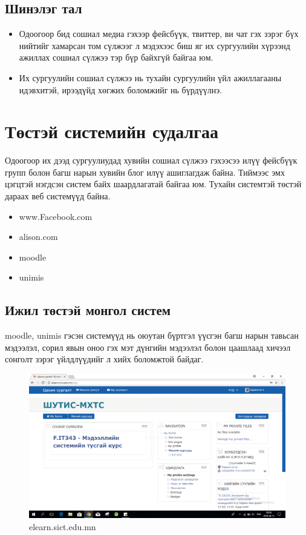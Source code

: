 \subsection{Шинэлэг тал}
\begin{itemize}
	\item Одоогоор бид сошиал медиа гэхээр фейсбүүк, твиттер, ви чат гэх зэрэг бүх нийтийг хамарсан том сүлжээг л мэдэхээс биш яг их сургуулийн хүрээнд ажиллах сошиал сүлжээ тэр бүр байхгүй байгаа юм.
	\item Их сургуулийн сошиал сүлжээ нь тухайн сургуулийн үйл ажиллагааны идэвхитэй, ирээдүйд хөгжих боломжийг нь бүрдүүлнэ.
\end{itemize}

\newpage
\section{Төстэй системийн судалгаа}
\hspace{1cm}Одоогоор их дээд сургуулиудад хувийн сошиал сүлжээ гэхээсээ илүү фейсбүүк групп болон багш нарын хувийн блог илүү ашиглагдаж байна. Тиймээс эмх цэгцтэй нэгдсэн систем байх шаардлагатай байгаа юм. Тухайн системтэй төстэй дараах веб системүүд байна. 
\begin{itemize}
	\item www.Facebook.com
	\item alison.com
	\item moodle
	\item unimis 
	
\end{itemize}
\subsection{Ижил төстэй монгол систем}
\hspace{1cm}moodle, unimis гэсэн системүүд нь оюутан бүртгэл үүсгэн багш нарын тавьсан мэдээлэл, сорил явын оноо гэх мэт дүнгийн мэдээлэл болон цаашлаад хичээл сонголт зэрэг үйлдлүүдийг л хийх боломжтой байдаг. 

\begin{figure}[htbp]
	\centering
	\includegraphics[scale=0.4]{Chart/Capture2}
	\caption[Мүүдл систем]{elearn.sict.edu.mn}
	\label{fig:Capture2}
\end{figure}

